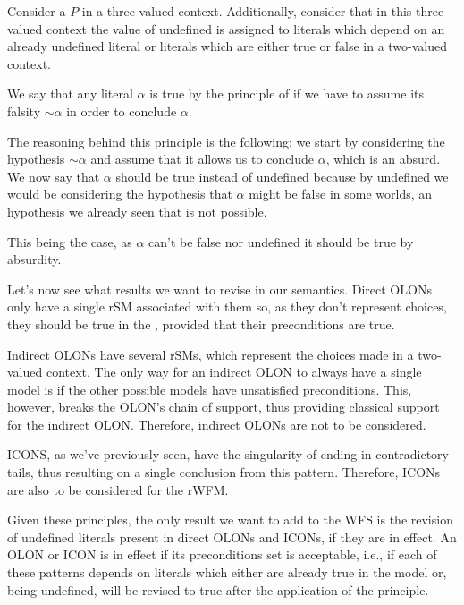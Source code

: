 \begin{definition}
Consider a \nlp $P$ in a three-valued context. Additionally, consider that in this three-valued context the value of undefined is assigned to literals which depend on an already undefined literal or literals which are either true or false in a two-valued context.

We say that any literal $\alpha$ is true by the principle of \raa if we have to assume its falsity $\sim \alpha$ in order to conclude $\alpha$. 

The reasoning behind this principle is the following: we start by considering the hypothesis $\sim\alpha$ and assume that it allows us to conclude $\alpha$, which is an absurd. We now say that $\alpha$ should be true instead of undefined because by undefined we would be considering the hypothesis that $\alpha$ might be false in some worlds, an hypothesis we already seen that is not possible.

This being the case, as $\alpha$ can't be false nor undefined it should be true by absurdity.
\end{definition}

Let's now see what results we want to revise in our semantics. Direct OLONs only have a single rSM associated with them so, as they don't represent choices, they should be true in the \rwfm, provided that their preconditions are true.

Indirect OLONs have several rSMs, which represent the choices made in a two-valued context. The only way for an indirect OLON to always have a single model is if the other possible models have unsatisfied preconditions. This, however, breaks the OLON's chain of support, thus providing classical support for the indirect OLON. Therefore, indirect OLONs are not to be considered.

ICONS, as we've previously seen, have the singularity of ending in contradictory tails, thus resulting on a single conclusion from this pattern. Therefore, ICONs are also to be considered for the rWFM.

Given these principles, the only result we want to add to the WFS is the revision of undefined literals present in direct OLONs and ICONs, if they are in effect. An OLON or ICON is in effect if its preconditions set is acceptable, i.e., if each of these patterns depends on literals which either are already true in the model or, being undefined, will be revised to true after the application of the \raa principle. 

